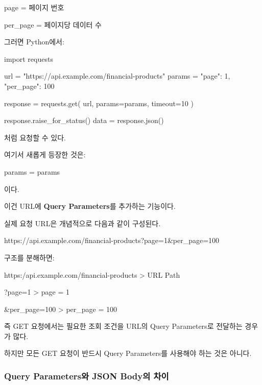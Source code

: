 \begin{dhksmry}
    page = 페이지 번호

    per_page = 페이지당 데이터 수
\end{dhksmry}

그러면 Python에서:

\begin{dhkcode}
import requests

url = "https://api.example.com/financial-products"
params = {
    "page": 1,
    "per_page": 100
}

response = requests.get(
    url,
    params=params,
    timeout=10
)

response.raise_for_status()
data = response.json()
\end{dhkcode}

처럼 요청할 수 있다.

여기서 새롭게 등장한 것은:

\begin{dhkcode}
params = params
\end{dhkcode}

이다.

이건 URL에 \textbf{Query Parameters}를 추가하는 기능이다.

실제 요청 URL은 개념적으로 다음과 같이 구성된다.

\begin{dhkzsh}
https://api.example.com/financial-products?page=1&per_page=100
\end{dhkzsh}

구조를 분해하면:

\begin{dhkdir}
https:/api.example.com/financial-products
> URL Path
\end{dhkdir}

\begin{dhkdir}
?page=1
> page = 1
\end{dhkdir}

\begin{dhkdir}
&per_page=100
> per_page = 100
\end{dhkdir}

즉 GET 요청에서는 필요한 조회 조건을 URL의 Query Parameters로 전달하는 경우가 많다.

하지만 모든 GET 요청이 반드시 Query Parameters를 사용해야 하는 것은 아니다.

\subsubsection{Query Parameters와 JSON Body의 차이}

